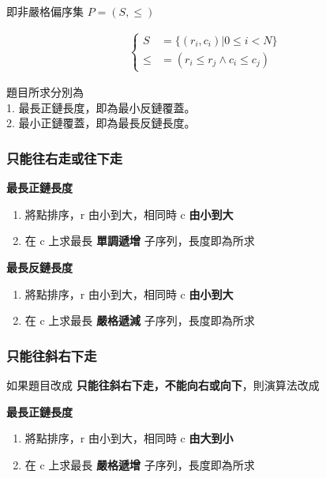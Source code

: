 \documentclass[10pt,oneside]{article}
\begin{document}
\begin{landscape}
\begin{multicols}{2}
{\noindent 即非嚴格偏序集 $P = (S, \le)$

\begin{equation}
\begin{split}
\begin{cases}
    	S &= \{ (r_i, c_i) | 0 \le i < N \} \\
    	\le &= (r_i \le r_j \land c_i \le c_j)
\end{cases}
\end{split}
\end{equation}

\noindent 題目所求分別為\\
1. 最長正鏈長度，即為最小反鏈覆蓋。\\
2. 最小正鏈覆蓋，即為最長反鏈長度。
}

\subsubsection{只能往右走或往下走}

{\normalsize
\textbf{最長正鏈長度}

\begin{enumerate}
	\item 將點排序，r 由小到大，相同時 c \textbf{由小到大}
	\item 在 c 上求最長 \textbf{單調遞增} 子序列，長度即為所求
\end{enumerate}
}

{\normalsize
\noindent \textbf{最長反鏈長度}

\begin{enumerate}
	\item 將點排序，r 由小到大，相同時 c \textbf{由小到大}
	\item 在 c 上求最長 \textbf{嚴格遞減} 子序列，長度即為所求
\end{enumerate}
}

\columnbreak
\subsubsection{只能往斜右下走}
{\normalsize
如果題目改成 \textbf{只能往斜右下走，不能向右或向下}，則演算法改成
}

{\normalsize
\noindent  \textbf{最長正鏈長度}

\begin{enumerate}
	\item 將點排序，r 由小到大，相同時 c \textbf{由大到小}
	\item 在 c 上求最長 \textbf{嚴格遞增} 子序列，長度即為所求
\end{enumerate}
}


\end{multicols}
\end{landscape}
\end{document}
